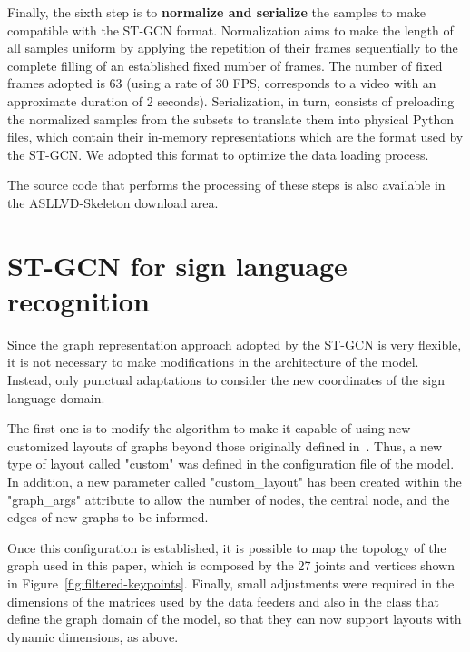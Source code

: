Finally, the sixth step is to \textbf{normalize and serialize} the samples to make compatible with the ST-GCN format. Normalization aims to make the length of all samples uniform by applying the repetition of their frames sequentially to the complete filling of an established fixed number of frames. The number of fixed frames adopted is 63 (using a rate of 30 FPS, corresponds to a video with an approximate duration of 2 seconds). Serialization, in turn, consists of preloading the normalized samples from the subsets to translate them into physical Python~\cite{python} files, which contain their in-memory representations which are the format used by the ST-GCN. We adopted this format to optimize the data loading process. %

The source code that performs the processing of these steps is also available in the ASLLVD-Skeleton download area.


\section{ST-GCN for sign language recognition} 
\label{sec:st-gcn-for-sl-recognition}

Since the graph representation approach adopted by the ST-GCN is very flexible, it is not necessary to make modifications in the architecture of the model. Instead, only punctual adaptations to consider the new coordinates of the sign language domain.

The first one is to modify the algorithm to make it capable of using new customized layouts of graphs beyond those originally defined in~\cite{st-gcn-2018}. Thus, a new type of layout called "custom" was defined in the configuration file of the model. In addition, a new parameter called "custom\_layout" has been created within the "graph\_args" attribute to allow the number of nodes, the central node, and the edges of new graphs to be informed.

Once this configuration is established, it is possible to map the topology of the graph used in this paper, which is composed by the 27 joints and vertices shown in  Figure~\ref{fig:filtered-keypoints}. Finally, small adjustments were required in the dimensions of the matrices used by the data feeders and also in the class that define the graph domain of the model, so that they can now support layouts with dynamic dimensions, as above.

